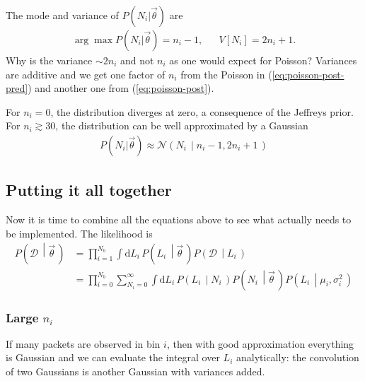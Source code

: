 \documentclass[a4,12pt]{article}
\newcommand{\data}{\ensuremath{\mathcal{D}}}
\newcommand{\given}[2]{\left(#1\, \middle| #2 \, \right)}
\newcommand{\gaussian}{\ensuremath{\mathcal{N}}}
\newcommand{\Lumi}{\ensuremath{L_i}}
\newcommand{\rmdx}[1]{\mbox{d} #1 \,} %
\newcommand{\vecth}{\ensuremath{{\vec{\theta}}}}
\newcommand{\mui}{\mu_i}
\newcommand{\sigi}{\sigma_i^2}
\def \refeq#1{(\ref{eq:#1})}
\begin{document}
The mode and variance of $P(N_i | \vecth)$ are
\begin{align}
  \label{eq:poisson-mode-variance}
  \arg \max P(N_i | \vecth) = n_i -1, && V[N_i] = 2 n_i + 1.
\end{align}
Why is the variance $\sim 2 n_i$ and not $n_i$ as one would expect for Poisson? Variances are additive and we get one factor of $n_i$ from the Poisson in \refeq{poisson-post-pred} and another one from \refeq{poisson-post}.

For $n_i=0$, the distribution diverges at zero, a consequence of the
Jeffreys prior.  For $n_i \gtrsim 30$, the distribution can be well
approximated by a Gaussian
\begin{align}
  \label{eq:poisson-gauss-approx}
  P(N_i | \vecth) \approx \gaussian \given{N_i}{n_i-1, 2 n_i + 1}
\end{align}

\subsection{Putting it all together}

Now it is time to combine all the equations above to see what actually
needs to be implemented. The likelihood is
\begin{align}
  \label{eq:all-likelihood}
  P\given{\data}{\vecth} &= \prod_{i=1}^{N_b} \int \rmdx{\Lumi} P\given{\Lumi}{\vecth}   P\given{\data}{\Lumi}\\
  &= \prod_{i=0}^{N_b} \sum_{N_i=0}^\infty \int \rmdx{\Lumi} P \given{\Lumi}{N_i}
  P\given{N_i}{\vecth} P\given{\Lumi}{\mui, \sigi}
\end{align}


\subsubsection*{Large $n_i$}

If many packets are observed in bin $i$, then with good approximation
everything is Gaussian and we can evaluate the integral over $\Lumi$
analytically: the convolution of two Gaussians is another Gaussian
with variances added.
\end{document}
